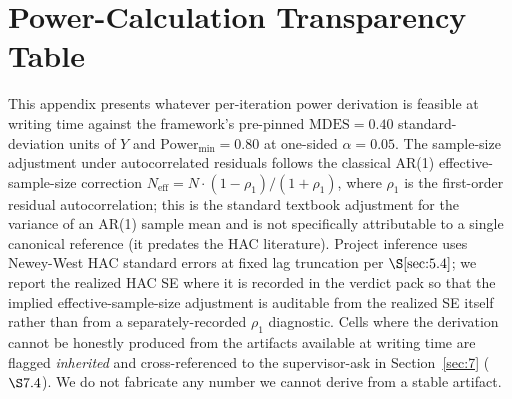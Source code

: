 \section{Power-Calculation Transparency Table}\label{app:D}

This appendix presents whatever per-iteration power derivation is
feasible at writing time against the framework's pre-pinned
\(\mathrm{MDES} = 0.40\) standard-deviation units of \(Y\) and
\(\mathrm{Power}_{\min} = 0.80\) at one-sided \(\alpha = 0.05\). The
sample-size adjustment under autocorrelated residuals follows the
classical AR(1) effective-sample-size correction
\(N_{\mathrm{eff}} = N \cdot (1 - \rho_1)/(1 + \rho_1)\), where
\(\rho_1\) is the first-order residual autocorrelation; this is the
standard textbook adjustment for the variance of an AR(1) sample mean
and is not specifically attributable to a single canonical reference
(it predates the HAC literature). Project inference uses
Newey-West HAC standard errors \citep{neweywest1987} at fixed lag
truncation per \(\S\ref{sec:5.4}\); we report the realized HAC SE
where it is recorded in the verdict pack so that the implied
effective-sample-size adjustment is auditable from the realized SE
itself rather than from a separately-recorded \(\rho_1\) diagnostic.
Cells where the derivation cannot be honestly produced from the
artifacts available at writing time are flagged \emph{inherited} and
cross-referenced to the supervisor-ask in Section~\ref{sec:7}
(\(\S 7.4\)). We do not fabricate any number we cannot derive from a
stable artifact.

